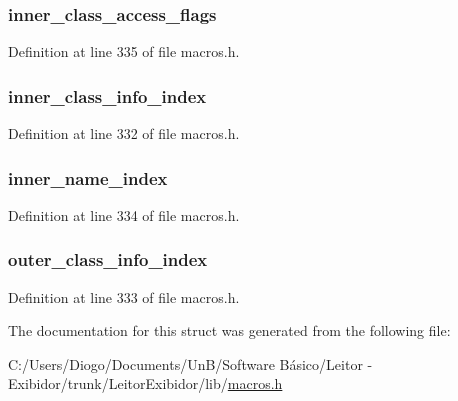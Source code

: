 \subsubsection[{inner\+\_\+class\+\_\+access\+\_\+flags}]{ inner\+\_\+class\+\_\+access\+\_\+flags}\label{struct_classes_ac48b6a5142c6e2ddcd51d41ab733eb15}


Definition at line 335 of file macros.\+h.

\hypertarget{struct_classes_a84a9a6c8c14f8900137a8f51b446d6c2}{}
\subsubsection[{inner\+\_\+class\+\_\+info\+\_\+index}]{ inner\+\_\+class\+\_\+info\+\_\+index}\label{struct_classes_a84a9a6c8c14f8900137a8f51b446d6c2}


Definition at line 332 of file macros.\+h.

\hypertarget{struct_classes_ac792b66aa74db5d300bf22502fb49ef1}{}
\subsubsection[{inner\+\_\+name\+\_\+index}]{ inner\+\_\+name\+\_\+index}\label{struct_classes_ac792b66aa74db5d300bf22502fb49ef1}


Definition at line 334 of file macros.\+h.

\hypertarget{struct_classes_a3b7a87f79f7ea8908d258f19b237bec2}{}
\subsubsection[{outer\+\_\+class\+\_\+info\+\_\+index}]{ outer\+\_\+class\+\_\+info\+\_\+index}\label{struct_classes_a3b7a87f79f7ea8908d258f19b237bec2}


Definition at line 333 of file macros.\+h.



The documentation for this struct was generated from the following file\+:\begin{DoxyCompactItemize}
\item 
C\+:/\+Users/\+Diogo/\+Documents/\+Un\+B/\+Software Básico/\+Leitor -\/ Exibidor/trunk/\+Leitor\+Exibidor/lib/\hyperlink{macros_8h}{macros.\+h}\end{DoxyCompactItemize}
